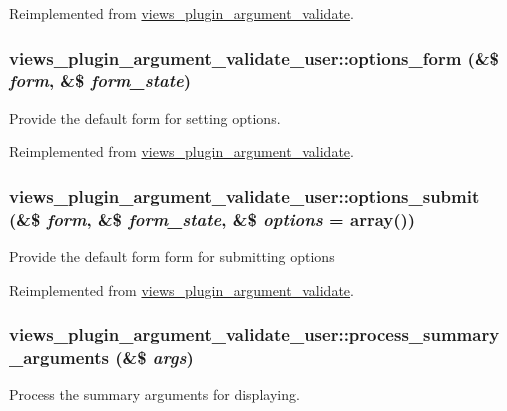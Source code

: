 Reimplemented from \hyperlink{classviews__plugin__argument__validate_aebc7a373a95a76ecb64345f558453b2d}{views\_\-plugin\_\-argument\_\-validate}.\hypertarget{classviews__plugin__argument__validate__user_a63c0da1ae23df4d74b0e38e4e27f2bd7}{
\subsubsection[{options\_\-form}]{\setlength{\rightskip}{0pt plus 5cm}views\_\-plugin\_\-argument\_\-validate\_\-user::options\_\-form (\&\$ {\em form}, \/  \&\$ {\em form\_\-state})}}
\label{classviews__plugin__argument__validate__user_a63c0da1ae23df4d74b0e38e4e27f2bd7}
Provide the default form for setting options. 

Reimplemented from \hyperlink{classviews__plugin__argument__validate_a619aac79800de4535d25fd93ce1f08cc}{views\_\-plugin\_\-argument\_\-validate}.\hypertarget{classviews__plugin__argument__validate__user_afdcb2900871aef06cd2263afebabe99f}{
\subsubsection[{options\_\-submit}]{\setlength{\rightskip}{0pt plus 5cm}views\_\-plugin\_\-argument\_\-validate\_\-user::options\_\-submit (\&\$ {\em form}, \/  \&\$ {\em form\_\-state}, \/  \&\$ {\em options} = {\ttfamily array()})}}
\label{classviews__plugin__argument__validate__user_afdcb2900871aef06cd2263afebabe99f}
Provide the default form form for submitting options 

Reimplemented from \hyperlink{classviews__plugin__argument__validate_aff1c9fc15ddc984fb1157f97274e3e6e}{views\_\-plugin\_\-argument\_\-validate}.\hypertarget{classviews__plugin__argument__validate__user_af49e3a8adbb930ba83d0343d7d12db0f}{
\subsubsection[{process\_\-summary\_\-arguments}]{\setlength{\rightskip}{0pt plus 5cm}views\_\-plugin\_\-argument\_\-validate\_\-user::process\_\-summary\_\-arguments (\&\$ {\em args})}}
\label{classviews__plugin__argument__validate__user_af49e3a8adbb930ba83d0343d7d12db0f}
Process the summary arguments for displaying.

